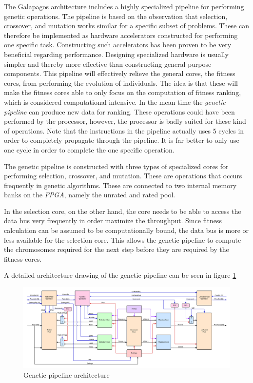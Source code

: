 The Galapagos architecture includes a highly specialized pipeline for performing genetic operations. The pipeline is based on the observation that selection, crossover, and mutation works similar for a specific subset of problems. These can therefore be implemented as hardware accelerators constructed for performing one specific task. Constructing such accelerators has been proven to be very beneficial regarding performance. Designing specialized hardware is usually simpler and thereby more effective than constructing general purpose components. This pipeline will effectively relieve the general cores, the fitness cores, from performing the evolution of individuals. The idea is that these will make the fitness cores able to only focus on the computation of fitness ranking, which is considered computational intensive. In the mean time the \emph{genetic pipeline} can produce new data for ranking. These operations could have been performed by the processor, however, the processor is badly suited for these kind of operations. Note that the instructions in the pipeline actually uses 5 cycles in order to completely propagate through the pipeline. It is far better to only use one cycle in order to complete the one specific operation.  

The genetic pipeline is constructed with three types of specialized cores for performing selection, crossover, and mutation. These are operations that occurs frequently in genetic algorithms. These are connected to two internal memory banks on the \emph{FPGA}, namely the unrated and rated pool.

In the selection core, on the other hand, the core needs to be able to access the data bus very frequently in order maximize the throughput.
Since fitness calculation can be assumed to be computationally bound, the data bus is more or less available for the selection core.
This allows the genetic pipeline to compute the chromosomes required for the next step before they are required by the fitness cores. 

A detailed architecture drawing of the genetic pipeline can be seen in figure \ref{fpga:fig:genetic:genetic_pipeline}

\begin{figure}

  \centering
  \includegraphics[width=\textwidth]{fpga/fig/genetic_pipeline.png}
  \caption{Genetic pipeline architecture}
  \label{fpga:fig:genetic:genetic_pipeline}
\end{figure}




